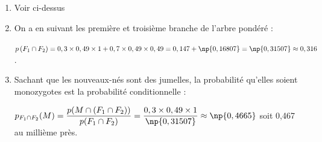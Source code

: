 \begin{enumerate}
	\begin{enumerate}
		\item %
Voir ci-dessus
		\item %
On a en suivant les première et troisième branche de l'arbre pondéré :

$p\left(F_1 \cap F_2 \right) = 0,3 \times 0,49 \times 1 + 0,7 \times 0,49 \times 0,49 = 0,147 + \np{0,16807} = \np{0,31507} \approx 0,316$.
		\item %
Sachant que les nouveaux-nés sont des jumelles, la probabilité qu'elles soient monozygotes est la probabilité conditionnelle :

$p_{F_1 \cap F_2} (M) = \dfrac{p(M \cap (F_1 \cap F_2))}{p(F_1 \cap F_2)} = \dfrac{0,3 \times 0,49 \times 1}{\np{0,31507}} \approx \np{0,4665}$ soit 0,467 au millième près.
	\end{enumerate}
\end{enumerate}

\bigskip

